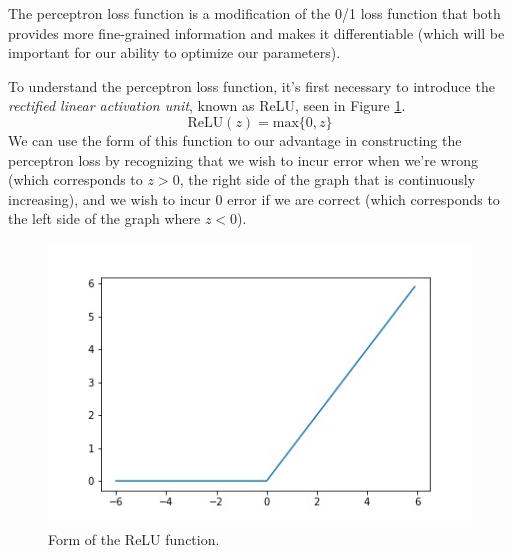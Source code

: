 The perceptron loss function is a modification of the 0/1 loss function that both provides more fine-grained information and makes it differentiable (which will be important for our ability to optimize our parameters).

To understand the perceptron loss function, it's first necessary to introduce the \textit{rectified linear activation unit}, known as ReLU, seen in Figure \ref{fig:relu-fn}.
\begin{equation}
	\text{ReLU}(z) = \text{max}\{0, z\}
\end{equation}
We can use the form of this function to our advantage in constructing the perceptron loss by recognizing that we wish to incur error when we're wrong (which corresponds to $z > 0$, the right side of the graph that is continuously increasing), and we wish to incur 0 error if we are correct (which corresponds to the left side of the graph where $z < 0$).
\begin{figure}
    \centering
    \includegraphics[width=0.5\paperwidth]{../Classification/fig/relu_fn_GEN.jpg}
    \caption{Form of the ReLU function.}
    \label{fig:relu-fn}
\end{figure}

